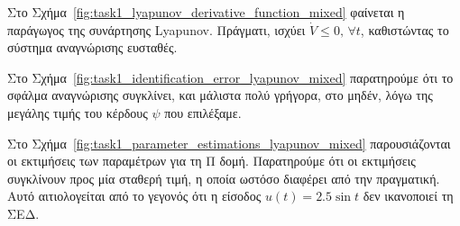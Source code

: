 \documentclass[a4paper,12pt]{article}
\begin{document}
Στο Σχήμα~\ref{fig:task1_lyapunov_derivative_function_mixed} φαίνεται η παράγωγος της συνάρτησης 
Lyapunov. Πράγματι, ισχύει 
$\dot{V} \leq 0, \, \forall t$, καθιστώντας το σύστημα αναγνώρισης ευσταθές.

Στο Σχήμα~\ref{fig:task1_identification_error_lyapunov_mixed} παρατηρούμε ότι το σφάλμα αναγνώρισης
συγκλίνει, και μάλιστα πολύ γρήγορα, στο μηδέν, λόγω της μεγάλης τιμής του κέρδους $\psi$ που επιλέξαμε.

Στο Σχήμα~\ref{fig:task1_parameter_estimations_lyapunov_mixed} παρουσιάζονται οι εκτιμήσεις των παραμέτρων
για τη Π δομή. Παρατηρούμε ότι οι εκτιμήσεις συγκλίνουν προς μία σταθερή τιμή, η οποία ωστόσο διαφέρει
από την πραγματική. Αυτό αιτιολογείται από το γεγονός ότι η είσοδος $u(t) = 2.5 \sin t$ δεν ικανοποιεί τη
ΣΕΔ.
\end{document}
